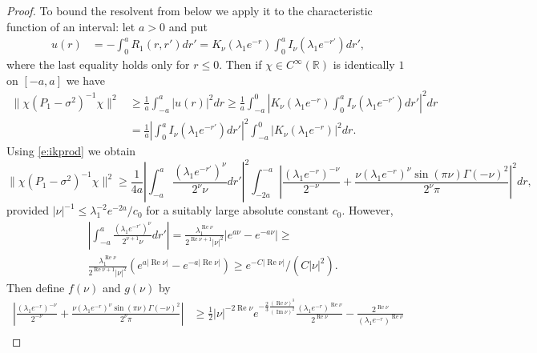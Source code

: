 \documentclass[reqno, 12pt]{amsart}
\newcommand \R {\mathbb{R}}
\DeclareMathOperator \re {Re}
\DeclareMathOperator \im {Im}
\theoremstyle{definition}
\numberwithin{equation}{section}
\numberwithin{prop}{section}
\numberwithin{figure}{section}
\begin{document}
\begin{proof}
To bound the resolvent from below we apply it to the characteristic function of an interval: let $ a > 0 $ and put
\[\begin{split}
u(r) &= -\int_0^a R_1(r,r')dr' = K_\nu(\lambda_1 e^{-r}) \int_0^a I_\nu(\lambda_1 e^{-r'}) dr',
\end{split}\]
where the last equality holds only for $r \le 0$.
Then if $\chi \in C^\infty(\R)$ is identically $1$ on $[-a,a]$ we have
\[\begin{split}
\|\chi (P_1- \sigma^2)^{-1} \chi\|^2 &\ge \frac 1 a\int_{-a}^{a} |u(r)|^2 dr \ge \frac 1 a\int_{-a}^0 \left |K_\nu(\lambda_1 e^{-r}) \int_0^a I_\nu(\lambda_1 e^{-r'}) dr'\right|^2 dr\\
&= \frac 1 {a} \left| \int_0^a I_\nu(\lambda_1 e^{-r'}) dr'\right|^2\int_{-a}^0 \left |K_\nu(\lambda_1 e^{-r})\right|^2 dr.
\end{split}\]
Using \eqref{e:ikprod} we obtain
\[
\|\chi (P_1- \sigma^2)^{-1} \chi\|^2 \ge \frac 1 {4a} \left| \int_{-a}^a \frac {(\lambda_1 e^{-r'})^\nu}{2^{\nu}\nu} dr'\right|^2\int_{-2a}^{-a} \left |\frac{(\lambda_1e^{-r})^{-\nu}}{2^{-\nu}} +  \frac{\nu (\lambda_1e^{-r})^\nu\sin(\pi\nu)\Gamma(-\nu)^2}{2^\nu \pi}\right|^2 dr,
\]
provided $ |\nu| ^{-1}  \le \lambda^{-2}_1 e^{-2a}/c_0$ for a suitably large absolute constant $c_0$.
However,
\[\begin{split}
&\left| \int_{-a}^a \frac {(\lambda_1 e^{-r'})^\nu}{2^{\nu+1}\nu} dr'\right| = \frac{\lambda_1^{\re \nu}}{2^{\re\nu + 1}|\nu|^2}|e^{a\nu}-e^{-a\nu}|\ge \\&\frac{\lambda_1^{\re \nu}}{2^{\re\nu + 1}|\nu|^2}\left(e^{a |\re \nu|} - e^{-a|\re\nu|}\right) \ge e^{-C|\re \nu|}/(C|\nu|^2).
\end{split}\]
Then define $f(\nu)$ and $g(\nu)$ by
\[\begin{split}
\left |\frac{(\lambda_1e^{-r})^{-\nu}}{2^{-\nu}} +  \frac{\nu (\lambda_1e^{-r})^\nu\sin(\pi\nu)\Gamma(-\nu)^2}{2^\nu \pi}\right| &\ge  \frac 12 |\nu|^{-2\re \nu} e^{-\frac 23 \frac{(\re \nu)^3}{(\im \nu)^2}}  \frac{(\lambda_1e^{-r})^{\re\nu}}{2^{\re\nu}} - \frac{2^{\re\nu}}{(\lambda_1e^{-r})^{\re\nu}} \\

\end{split}\]
\end{proof}
\end{document}
